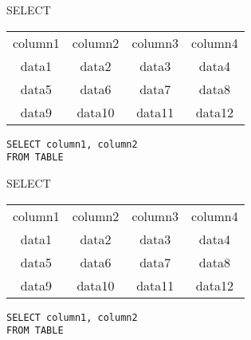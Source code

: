     
    \begin{frame}{SELECT}
    \begin{table}[h]
    \centering
    \begin{tabular}{|c|c|c|c|}
    \hline
    \rowcolor{cyan!30}\multicolumn{4}{|c|}{Table} \\
    \hline
    \rowcolor{cyan!30}column1 & column2 & column3 & column4 \\
    \hline
    data1 & data2 & data3 & data4 \\
    data5 & data6 & data7 & data8 \\
    data9 & data10 & data11 & data12 \\
    \hline
    \end{tabular}
    \end{table}
    
    \vspace{2em} 
    
    \texttt{SELECT column1, column2 \\FROM TABLE}
    \end{frame}
    \begin{frame}{SELECT}
    \begin{table}[h]
    \centering
    \begin{tabular}{|c|c|c|c|}
    \hline
    \rowcolor{cyan!30}\multicolumn{4}{|c|}{Table} \\
    \hline
    \rowcolor{cyan!30}column1 & column2 & column3 & column4 \\
    \hline
    \cellcolor{red!20} data1 & \cellcolor{red!20} data2 & data3 & data4 \\
    \cellcolor{red!20} data5 & \cellcolor{red!20} data6 & data7 & data8 \\
    \cellcolor{red!20} data9 & \cellcolor{red!20} data10 & data11 & data12 \\
    \hline
    \end{tabular}
    \end{table}
    \vspace{2em} 
    
    \texttt{SELECT column1, column2 \\FROM TABLE}
    \end{frame}
    
    
